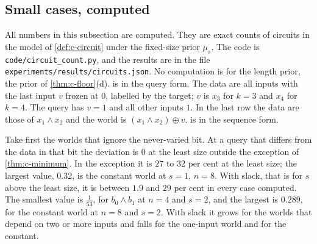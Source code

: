 \subsection{Small cases, computed}

All numbers in this subsection are computed. They are exact counts of circuits in the model of
\cref{def:c-circuit} under the fixed-size prior $\mu_s$. The code is \texttt{code/circuit\_count.py}, and the
results are in the file \texttt{experiments/results/circuits.json}. No computation is for the length prior,
the prior of \cref{thm:c-floor}(d).  is in the query form. The data are all inputs
with the last input $v$ frozen at $0$, labelled by the target; $v$ is $x_3$ for $k=3$ and $x_4$ for $k=4$. The
query has $v=1$ and all other inputs $1$. In the last row the data are those of $x_1\wedge x_2$ and the world
is $(x_1\wedge x_2)\oplus v$.  is in the sequence form.

\begin{table}[ht]\centering\small

\caption{Query form, computed. Deviation mass under $\mu_s$ at the query with the frozen input $v$ set to $1$
and all other inputs $1$, for sizes $s$ from the least size $s_D$ of a fitting circuit to $s_D+4$; for $k=4$
the count stops at $s=4$. The data are all inputs with $v=0$.}\label{tab:circuits-query}
\end{table}

\begin{table}[ht]\centering\small

\caption{Sequence form with $k=4$, computed. Posterior mass off the world's own next bit under $\mu_s$ at the
cut $n$, for $s=2,3,4$. The least size of a circuit that prints the context is $2$ in the second row and $1$
in the others. At $s=1$ the values are $1$ in the first row, $0$ in the third and fourth, $0.270$ in the fifth
and $0.320$ in the sixth (results file).}\label{tab:circuits-seq}
\end{table}

Take first the worlds that ignore the never-varied bit. At a query that differs from the data in that bit the
deviation is $0$ at the least size outside the exception of \cref{thm:c-minimum}. In the exception it is $27$
to $32$ per cent at the least size; the largest value, $0.32$, is the constant world at $s=1$, $n=8$. With
slack, that is for $s$ above the least size, it is between $1.9$ and $29$ per cent in every case computed. The
smallest value is $\frac1{53}$, for $b_0\wedge b_1$ at $n=4$ and $s=2$, and the largest is $0.289$, for the
constant world at $n=8$ and $s=2$. With slack it grows for the worlds that depend on two or more inputs and
falls for the one-input world and for the constant.

